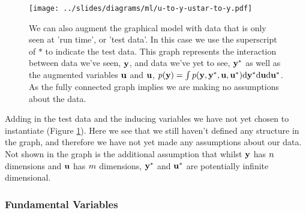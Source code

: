 \documentclass[a4paperpaper,]{article}
\begin{document}
\begin{figure}[htb]
\texttt{[image: ../slides/diagrams/ml/u-to-y-ustar-to-y.pdf]}


\caption{We can also augment the graphical model with data that is only seen at 'run time', or 'test data'. In this case we use the superscript of $*$ to indicate the test data. This graph represents the interaction between data we've seen, $\mathbf{ y}$, and data we've yet to see, $\mathbf{ y}^*$ as well as the augmented variables $\mathbf{ u}$ and $\mathbf{ u}$, $p(\mathbf{ y}) = \int p(\mathbf{ y}, \mathbf{ y}^*, \mathbf{ u}, \mathbf{ u}^*) \text{d}\mathbf{ y}^* \text{d}\mathbf{ u} \text{d}\mathbf{ u}^*$. As the fully connected graph implies we are making no assumptions about the data.}
\label{u-to-y-ustar-to-y}
\end{figure}

Adding in the test data and the inducing variables we have not yet
chosen to instantiate (Figure \ref{u-to-y-ustar-to-y}). Here we see that
we still haven't defined any structure in the graph, and therefore we
have not yet made any assumptions about our data. Not shown in the graph
is the additional assumption that whilst \(\mathbf{ y}\) has
\(n\) dimensions and \(\mathbf{ u}\) has \(m\)
dimensions, \(\mathbf{ y}^*\) and \(\mathbf{ u}^*\) are potentially
infinite dimensional.

\hypertarget{fundamental-variables}{%
\subsubsection{Fundamental Variables}\label{fundamental-variables}}
\end{document}
